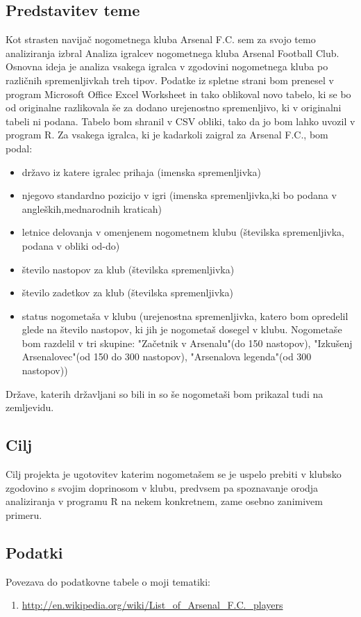 \documentclass[11pt,a4paper]{article}
\begin{document}
\subsection{Predstavitev teme}
Kot strasten navijač nogometnega kluba Arsenal F.C. sem za svojo temo analiziranja izbral Analiza igralcev nogometnega kluba Arsenal Football Club. Osnovna ideja je analiza vsakega igralca v zgodovini nogometnega kluba po različnih spremenljivkah treh tipov. Podatke iz spletne strani bom prenesel v program  Microsoft Office Excel Worksheet in tako oblikoval novo tabelo, ki se bo od originalne razlikovala še za dodano urejenostno spremenljivo, ki v originalni tabeli ni podana. Tabelo bom shranil v CSV obliki, tako da jo bom lahko uvozil v program  R. Za vsakega igralca, ki je kadarkoli zaigral za Arsenal F.C., bom podal: 
\begin{itemize}
\item{državo iz katere igralec prihaja (imenska spremenljivka)}
\item{njegovo standardno pozicijo v igri (imenska spremenljivka,ki bo podana v angleških,mednarodnih kraticah)}
\item{letnice delovanja v omenjenem nogometnem klubu (številska spremenljivka, podana v obliki od-do)}
\item{število nastopov za klub (številska spremenljivka)}
\item{število zadetkov za klub (številska spremenljivka)}
\item{status nogometaša v klubu (urejenostna spremenljivka, katero bom opredelil glede na število nastopov, ki jih je nogometaš dosegel v klubu. Nogometaše bom razdelil v tri skupine: "Začetnik v Arsenalu"(do 150 nastopov), "Izkušenj Arsenalovec"(od 150 do 300 nastopov), "Arsenalova legenda"(od 300 nastopov))}
\end{itemize}
Države, katerih državljani so bili in so še nogometaši bom prikazal tudi na zemljevidu.

\subsection{Cilj}
Cilj projekta je ugotovitev katerim nogometašem se je uspelo prebiti v klubsko zgodovino s svojim doprinosom v klubu, predvsem pa spoznavanje orodja analiziranja v programu R na nekem konkretnem, zame osebno zanimivem primeru. 

\subsection{Podatki}
Povezava do podatkovne tabele o moji tematiki: 
\begin{enumerate}
\item{\url{http://en.wikipedia.org/wiki/List_of_Arsenal_F.C._players}}
\end{enumerate}
\end{document}
